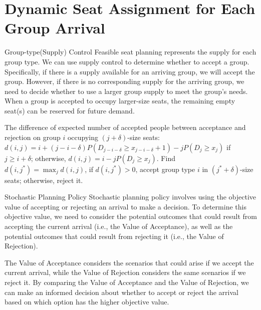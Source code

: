 
\section{Dynamic Seat Assignment for Each Group Arrival}
    \frame{\sectionpage}

    \begin{frame}{Group-type(Supply) Control}
    Feasible seat planning represents the supply for each group type. We can use supply control to
determine whether to accept a group. Specifically, if there is a supply available for an arriving group, we will accept the group. However, if there is no corresponding supply for the arriving group, we need to decide whether to use a larger group supply to meet the group’s needs. When a group is accepted to occupy larger-size seats, the remaining empty seat(s) can be reserved for future demand.
    
The difference of expected number of accepted people between acceptance and rejection on group $i$ occupying $(j+\delta)$-size seats: $d(i,j) = i + (j-i-\delta)P(D_{j-i-\delta} \geq x_{j-i-\delta}+1) - j P(D_{j} \geq x_{j})$ if $j \geq i+\delta$; otherwise, $d(i,j) = i - j P(D_{j} \geq x_{j})$.
Find $d(i,j^{*}) = \max_{j} d(i,j)$, if $d(i,j^{*}) > 0$, accept group type $i$ in $(j^{*}+\delta)$-size seats; otherwise, reject it.
      \end{frame}

\begin{frame}{Stochastic Planning Policy}
  Stochastic planning policy involves using the objective value of accepting or rejecting an arrival to make a decision. To determine this objective value, we need to consider the potential outcomes that could result from accepting the current arrival (i.e., the Value of Acceptance), as well as the potential outcomes that could result from rejecting it (i.e., the Value of Rejection).

  The Value of Acceptance considers the scenarios that could arise if we accept the current arrival, while the Value of Rejection considers the same scenarios if we reject it. By comparing the Value of Acceptance and the Value of Rejection, we can make an informed decision about whether to accept or reject the arrival based on which option has the higher objective value.
\end{frame}


